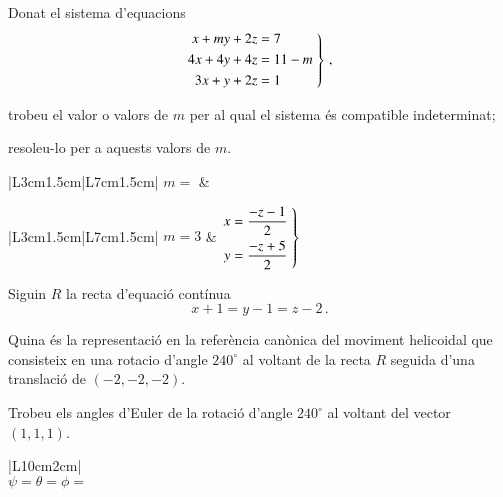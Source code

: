 \documentclass[10pt,catalan]{article}
\begin{document}
\begin{enunciat}
Donat el sistema d'equacions
\[
  \left.\aligned x + m y + 2 z &= 7 \\ 4 x + 4 y + 4 z &= 11 - m \\ 3 x + y + 2 z &= 1 \endaligned\;\right\}\,,
\]
\begin{apartats}
\item trobeu el valor o valors de $m$ per al qual el sistema és compatible indeterminat;
\item resoleu-lo per a aquests valors de $m$.
\end{apartats}
\end{enunciat}

\begin{quadricula}
\begin{tabular}{|L{3cm}{1.5cm}|L{7cm}{1.5cm}|}
\hline
$m=$ & \\
\hline
\end{tabular}
\end{quadricula}

\begin{solucio}
\begin{center}
\begin{tabular}{|L{3cm}{1.5cm}|L{7cm}{1.5cm}|}
\hline
$m=3$ & $\left.\aligned x &= \frac{- z -1}{2} \\ y &= \frac{- z + 5}{2} \endaligned\;\right\}$\\
\hline
\end{tabular}
\end{center}
\end{solucio}





\begin{enunciat}
Siguin $R$ la recta d'equació contínua
\[
  x + 1 = y - 1 = z - 2\,.
\]
\begin{apartats}
\item Quina és la representació en la referència canònica del moviment helicoidal que consisteix en una rotacio d'angle $240^\circ$ al voltant de la recta $R$ seguida d'una translació de $(-2,-2,-2)$.
\item Trobeu els angles d'Euler de la rotació d'angle $240^\circ$ al voltant del vector $(1,1,1)$.
\end{apartats}
\end{enunciat}

\begin{quadricula}
\begin{tabular}{|L{10cm}{2cm}|}
\hline
  \\
\hline
{}
{$\psi=$\hspace{3.5cm}$\theta=$\hspace{3.5cm}$\phi=$\hspace{3.5cm}} \\
\hline
\end{tabular}
\end{quadricula}
\end{document}

